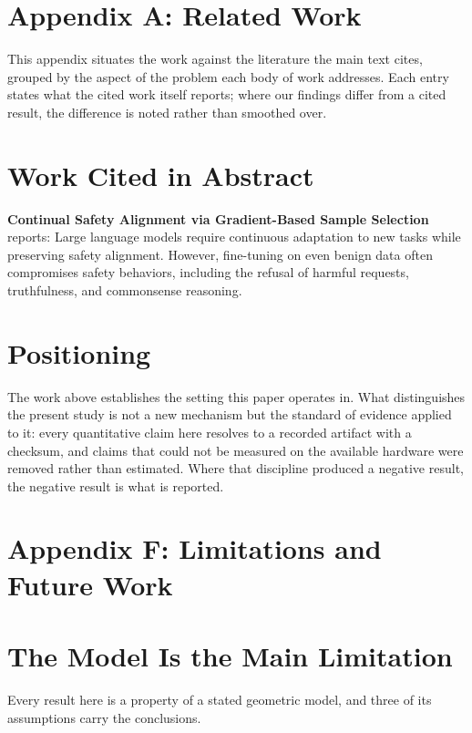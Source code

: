\documentclass[10pt,journal,compsoc,twocolumn]{IEEEtran}
\begin{document}
\section{Appendix A: Related Work}


This appendix situates the work against the literature the main text cites, grouped by the aspect of the problem each body of work addresses. Each entry states what the cited work itself reports; where our findings differ from a cited result, the difference is noted rather than smoothed over.


\section{Work Cited in Abstract}


\textbf{Continual Safety Alignment via Gradient-Based Sample Selection} \cite{arxiv_2604_17215} reports: Large language models require continuous adaptation to new tasks while preserving safety alignment. However, fine-tuning on even benign data often compromises safety behaviors, including the refusal of harmful requests, truthfulness, and commonsense reasoning.


\section{Positioning}


The work above establishes the setting this paper operates in. What distinguishes the present study is not a new mechanism but the standard of evidence applied to it: every quantitative claim here resolves to a recorded artifact with a checksum, and claims that could not be measured on the available hardware were removed rather than estimated. Where that discipline produced a negative result, the negative result is what is reported.





\section{Appendix F: Limitations and Future Work}



\section{The Model Is the Main Limitation}


Every result here is a property of a stated geometric model, and three of its assumptions carry the conclusions.
\end{document}
